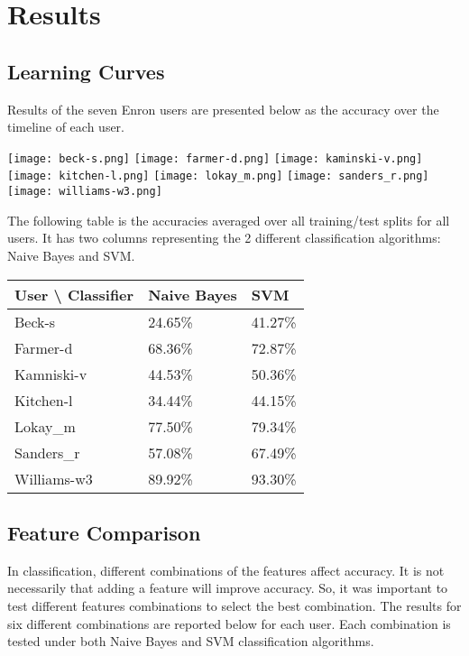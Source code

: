 \section{Results}

\subsection{Learning Curves}
Results of the seven Enron users are presented below as the accuracy over the timeline of each user.

\texttt{[image: beck-s.png]}
\texttt{[image: farmer-d.png]}
\texttt{[image: kaminski-v.png]}
\texttt{[image: kitchen-l.png]}
\texttt{[image: lokay\_m.png]}
\texttt{[image: sanders\_r.png]}
\texttt{[image: williams-w3.png]}

The following table is the accuracies averaged over all training/test splits for all users. It has two columns representing the 2 different classification algorithms: Naive Bayes and SVM.

\begin{center}
    \begin{tabular}{ | l | l | l |}
    \hline
    User {\textbackslash}  Classifier & Naive Bayes & SVM \\ \hline
    Beck-s & 24.65\% & 41.27\% \\ \hline
    Farmer-d & 68.36\% & 72.87\% \\ \hline
    Kamniski-v & 44.53\% & 50.36\% \\ \hline
    Kitchen-l & 34.44\% & 44.15\% \\ \hline
    Lokay\_m & 77.50\% & 79.34\% \\ \hline
    Sanders\_r & 57.08\% & 67.49\% \\ \hline
    Williams-w3 & 89.92\% & 93.30\% \\
    \hline
    \end{tabular}
\end{center}

\subsection{Feature Comparison}
In classification, different combinations of the features affect accuracy. It is not necessarily that adding a feature will improve accuracy. So, it was important to test different features combinations to select the best combination. The results for six different combinations are reported below for each user. Each combination is tested under both Naive Bayes and SVM classification algorithms.

